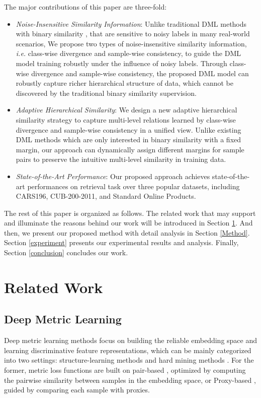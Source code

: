 \documentclass[lettersize,journal]{IEEEtran}
\begin{document}
The major contributions of this paper are three-fold:

\begin{itemize}
	\item \textit{Noise-Insensitive Similarity Information}: Unlike traditional DML methods with binary similarity \cite{oh2016deep,wang2019multi}, that are sensitive to noisy labels in many real-world scenarios, We propose two types of  noise-insensitive similarity information, \textit{i.e.} class-wise divergence and sample-wise consistency, to guide the DML model training robustly under the influence of noisy labels. Through  class-wise divergence and sample-wise consistency, the proposed DML model can robustly capture richer hierarchical structure of data, which cannot be discovered by the traditional binary similarity supervision. 
	\item \textit{Adaptive Hierarchical Similarity}: We design a new adaptive hierarchical similarity strategy to capture multi-level relations learned by class-wise divergence and sample-wise consistency in a unified view. Unlike existing DML methods which are only interested in binary similarity with a fixed margin, our approach can dynamically assign different margins for sample pairs to preserve the intuitive multi-level similarity in training data.
	\item \textit{State-of-the-Art Performance}: Our proposed approach achieves state-of-the-art performances on  retrieval task over three popular datasets, including CARS196, CUB-200-2011, and Standard Online Products.
\end{itemize}

The rest of this paper is organized as follows. The related work that may support and illuminate the reasons behind our work will be introduced in Section \ref{RW}. And then, we present our proposed method with detail analysis in Section \ref{Method}. Section \ref{experiment} presents our experimental results and analysis.
Finally, Section \ref{conclusion} concludes our work.


\section{Related Work}

\label{RW}

\subsection{Deep Metric Learning}
Deep metric learning methods focus on building the reliable embedding space and learning discriminative feature representations, which can be  mainly categorized into two settings: structure-learning methods and hard mining methods \cite{oh2016deep,ge2018deep,duan2018deep,duan2019deep,suh2019stochastic}. For the former, metric loss functions are built on pair-based \cite{hadsell2006dimensionality,ustinova2016learning,oh2016deep,wang2019multi,sun2020circle}, optimized by computing the pairwise similarity between samples in the embedding space,
or Proxy-based \cite{movshovitz2017no,qian2019softtriple,kim2020proxy,zhu2020fewer}, guided by comparing each sample with proxies. 
\end{document}
